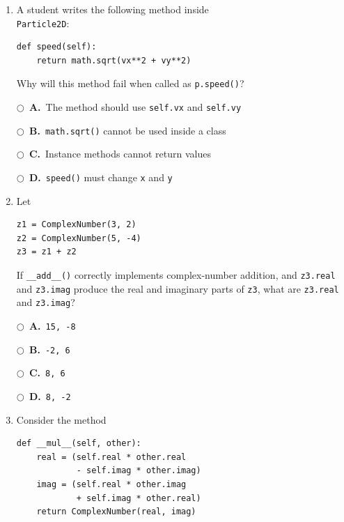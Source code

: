 \documentclass[11pt]{article}
\newcommand{\choice}[2]{%
    \par\noindent
    \(\bigcirc\)\ \textbf{#1.}\ #2
}
\begin{document}
\begin{enumerate}
\begin{verbatim}
p1 = Particle2D(0, 0, 2, 1)
p2 = Particle2D(0, 0, -1, 3)

p1.update(1.0)
print(p2.x, p2.y)
\end{verbatim}

What is printed, and why?

\choice{A}{\texttt{2 1}, because all instances share the same position}
\choice{B}{\texttt{-1 3}, because creating \texttt{p2} automatically updates it}
\choice{C}{\texttt{0 0}, because \texttt{update()} was called only on \texttt{p1}}
\choice{D}{An error occurs because two instances cannot exist at once}

\item A student writes the following method inside \\ \texttt{Particle2D}:

\begin{verbatim}
def speed(self):
    return math.sqrt(vx**2 + vy**2)
\end{verbatim}

Why will this method fail when called as \texttt{p.speed()}?

\choice{A}{The method should use \texttt{self.vx} and \texttt{self.vy}}
\choice{B}{\texttt{math.sqrt()} cannot be used inside a class}
\choice{C}{Instance methods cannot return values}
\choice{D}{\texttt{speed()} must change \texttt{x} and \texttt{y}}

\item Let

\begin{verbatim}
z1 = ComplexNumber(3, 2)
z2 = ComplexNumber(5, -4)
z3 = z1 + z2
\end{verbatim}

If \texttt{\_\_add\_\_()} correctly implements complex-number addition, and \texttt{z3.real} and \texttt{z3.imag} produce the real and imaginary parts of \texttt{z3}, what are \texttt{z3.real} and \texttt{z3.imag}?

\choice{A}{\texttt{15, -8}}
\choice{B}{\texttt{-2, 6}}
\choice{C}{\texttt{8, 6}}
\choice{D}{\texttt{8, -2}}

\item Consider the method

\begin{verbatim}
def __mul__(self, other):
    real = (self.real * other.real
            - self.imag * other.imag)
    imag = (self.real * other.imag
            + self.imag * other.real)
    return ComplexNumber(real, imag)
\end{verbatim}


\end{enumerate}
\end{document}
